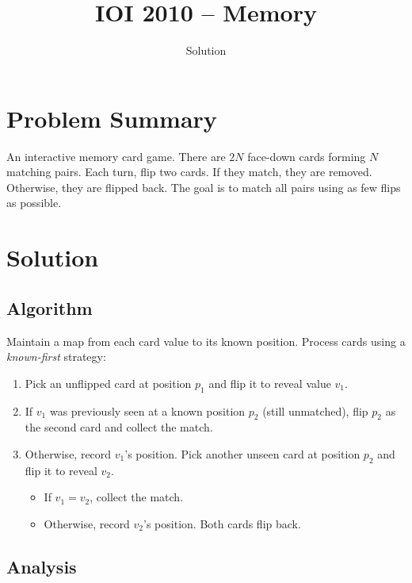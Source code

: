 \documentclass[11pt,a4paper]{article}
\title{IOI 2010 -- Memory}
\author{Solution}
\date{}
\begin{document}
\maketitle

\section{Problem Summary}
An interactive memory card game. There are $2N$ face-down cards forming $N$ matching pairs. Each turn, flip two cards. If they match, they are removed. Otherwise, they are flipped back. The goal is to match all pairs using as few flips as possible.

\section{Solution}

\subsection{Algorithm}
Maintain a map from each card value to its known position. Process cards using a \emph{known-first} strategy:

\begin{enumerate}
    \item Pick an unflipped card at position $p_1$ and flip it to reveal value $v_1$.
    \item If $v_1$ was previously seen at a known position $p_2$ (still unmatched), flip $p_2$ as the second card and collect the match.
    \item Otherwise, record $v_1$'s position. Pick another unseen card at position $p_2$ and flip it to reveal $v_2$.
    \begin{itemize}
        \item If $v_1 = v_2$, collect the match.
        \item Otherwise, record $v_2$'s position. Both cards flip back.
    \end{itemize}
\end{enumerate}

\subsection{Analysis}
\end{document}
